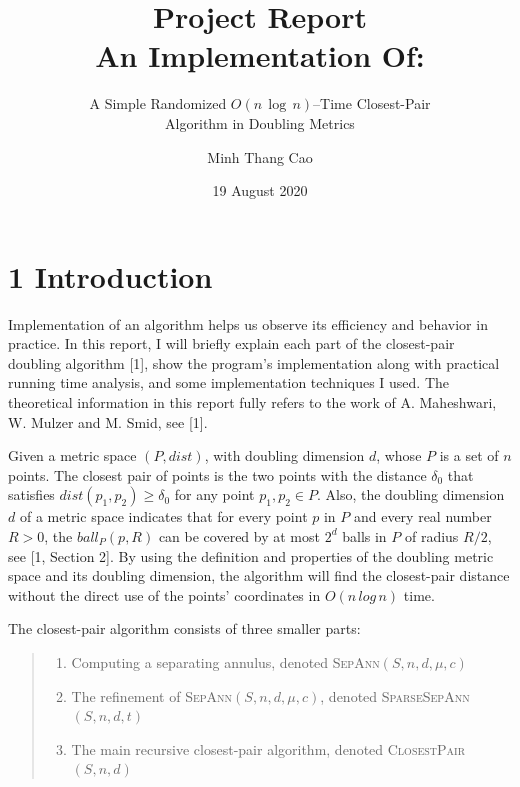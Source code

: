 \documentclass[12pt,english,]{article}
\title{\textbf{Project Report}\\
\Large{An Implementation Of:}}
\subtitle{A Simple Randomized \(O(n\,\log\, n)\)--Time Closest-Pair\\
Algorithm in Doubling Metrics}
\author{Minh Thang Cao}
\date{19 August 2020}
\begin{document}
\maketitle

\hypertarget{section1}{%
\section{\texorpdfstring{1
\enspace Introduction}{1 Introduction}}\label{section1}}

Implementation of an algorithm helps us observe its efficiency and
behavior in practice. In this report, I will briefly explain each part
of the closest-pair doubling algorithm {[}1{]}, show the program's
implementation along with practical running time analysis, and some
implementation techniques I used. The theoretical information in this
report fully refers to the work of A. Maheshwari, W. Mulzer and M. Smid,
see {[}1{]}.

Given a metric space \((P,dist)\), with doubling dimension \(d\), whose
\(P\) is a set of \(n\) points. The closest pair of points is the two
points with the distance \(\delta_0\) that satisfies
\(dist(p_1, p_2) \geq \delta_0\) for any point \(p_1, p_2 \in P\). Also,
the doubling dimension \(d\) of a metric space indicates that for every
point \(p\) in \(P\) and every real number \(R > 0\), the
\(ball_P(p, R)\) can be covered by at most \(2^d\) balls in \(P\) of
radius \(R/2\), see {[}1, Section 2{]}. By using the definition and
properties of the doubling metric space and its doubling dimension, the
algorithm will find the closest-pair distance without the direct use of
the points' coordinates in \(O(n\,log\,n)\) time.

The closest-pair algorithm consists of three smaller parts:

\vspace{-2.5truemm}

\begin{quote}
\begin{enumerate}
\item Computing a separating annulus, denoted \textsc{SepAnn}$(S,n,d,\mu,c)$
\item The refinement of \textsc{SepAnn}$(S,n,d,\mu,c)$, denoted \textsc{SparseSepAnn}$(S,n,d,t)$
\item The main recursive closest-pair algorithm, denoted \textsc{ClosestPair}$(S,n,d)$
\end{enumerate}
\end{quote}
\end{document}
